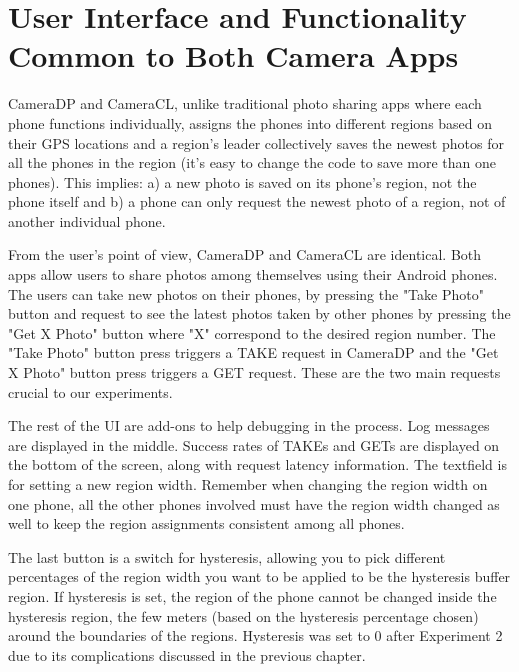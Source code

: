\chapter{User Interface and Functionality Common to Both Camera Apps}

CameraDP and CameraCL, unlike traditional photo sharing apps where each phone functions individually, assigns the phones into different regions based on their GPS locations and a region's leader collectively saves the newest photos for all the phones in the region (it's easy to change the code to save more than one phones). This implies: a) a new photo is saved on its phone's region, not the phone itself and b) a phone can only request the newest photo of a region, not of another individual phone. 

From the user's point of view, CameraDP and CameraCL are identical. Both apps allow users to share photos among themselves using their Android phones.  The users can take new photos on their phones, by pressing the "Take Photo" button and request to see the latest photos taken by other phones by pressing the "Get X Photo" button where "X" correspond to the desired region number.  The "Take Photo" button press triggers a TAKE request in CameraDP and the "Get X Photo" button press triggers a GET request. These are the two main requests crucial to our experiments.

The rest of the UI are add-ons to help debugging in the process. Log messages are displayed in the middle. Success rates of TAKEs and GETs are displayed on the bottom of the screen, along with request latency information. The textfield is for setting a new region width. Remember when changing the region width on one phone, all the other phones involved must have the region width changed as well to keep the region assignments consistent among all phones. 

The last button is a switch for hysteresis, allowing you to pick different percentages of the region width you want to be applied to be the hysteresis buffer region. If hysteresis is set, the region of the phone cannot be changed inside the hysteresis region, the few meters (based on the hysteresis percentage chosen) around the boundaries of the regions. Hysteresis was set to 0 after Experiment 2 due to its complications discussed in the previous chapter.




